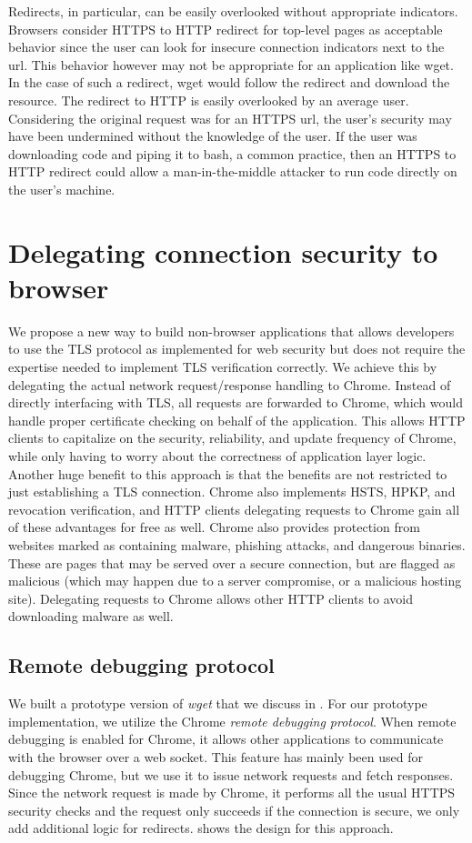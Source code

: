 Redirects, in particular, can be easily overlooked without appropriate
indicators. Browsers consider HTTPS to HTTP redirect for top-level pages as
acceptable behavior since the user can look for insecure connection indicators
next to the url. This behavior however may not be appropriate for an
application like wget. In the case of such a redirect, wget would follow the
redirect and download the resource. The redirect to HTTP is easily overlooked by
an average user. Considering the original request was for an HTTPS url, the
user's security may have been undermined without the knowledge of the user. If
the user was downloading code and piping it to bash, a common practice, then
an HTTPS to HTTP redirect could allow a man-in-the-middle attacker to run
code directly on the user's machine.


\section{Delegating connection security to browser}
\label{sec:solution-saber}

We propose a new way to build non-browser applications that allows developers
to use the TLS protocol as implemented for web security but does not require
the expertise needed to implement TLS verification correctly. We achieve this
by delegating the actual network request/response handling to Chrome. Instead
of directly interfacing with TLS, all requests are forwarded to Chrome, which
would handle proper certificate checking on behalf of the application. This
allows HTTP clients to capitalize on the security, reliability, and update
frequency of Chrome, while only having to worry about the correctness of
application layer logic. Another huge benefit to this approach is that the
benefits are not restricted to just establishing a TLS connection. Chrome also
implements HSTS, HPKP, and revocation verification, and HTTP clients delegating
requests to Chrome gain all of these advantages for free as well. Chrome also
provides protection from websites marked as containing malware, phishing
attacks, and dangerous binaries. These are pages that may be served over a
secure connection, but are flagged as malicious (which may happen due to a
server compromise, or a malicious hosting site). Delegating requests to Chrome
allows other HTTP clients to avoid downloading malware as well.

\subsection{Remote debugging protocol}
We built a prototype version of \emph{wget} that we discuss in
. For our prototype implementation, we utilize the Chrome
\emph{remote debugging protocol}. When remote debugging is enabled for Chrome,
it allows other applications to communicate with the browser over a web socket.
This feature has mainly been used for debugging Chrome, but we use it to issue
network requests and fetch responses. Since the network request is made by
Chrome, it performs all the usual HTTPS security checks and the request only
succeeds if the connection is secure, we only add additional logic for
redirects.  shows the design for this approach.

